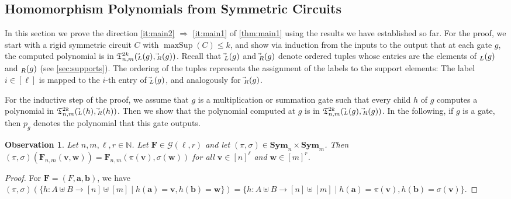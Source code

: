 \documentclass[10pt,a4paper]{article}
\theoremstyle{definition}
\theoremstyle{plain}
\newtheorem{observation}[definition]{Observation}
\theoremstyle{remark}
\newcommand{\Sym}{\mathbf{Sym}}
\let\sup\relax
\DeclareMathOperator{\sup}{sup}
\DeclareMathOperator{\maxSup}{maxSup}
\begin{document}
 	\subsection{Homomorphism Polynomials from Symmetric Circuits}
 
 	In this section we prove the direction \ref{it:main2} $\Rightarrow$ \ref{it:main1} of \cref{thm:main1} using the results we have established so far. For the proof, we start with a rigid symmetric circuit $C$ with $\maxSup(C) \leq k$, and show via induction from the inputs to the output that at each gate $g$, the computed polynomial is in $\mathfrak{T}^{2k}_{n,m}(\vec{\sup}_L(g), \vec{\sup}_R(g))$.  
 	Recall that $\vec{\sup}_L(g)$ and $\vec{\sup}_R(g)$ denote ordered tuples whose entries are the elements of $\sup_L(g)$ and $\sup_R(g)$ (see \cref{sec:supports}). The ordering of the tuples represents the assignment of the labels to the support elements:
 	The label $i \in[\ell]$ is mapped to the $i$-th entry of $\vec{\sup}_L(g)$, and analogously for $\vec{\sup}_R(g)$. 
 	
 	For the inductive step of the proof, we assume that $g$ is a multiplication or summation gate such that every child $h$ of $g$ computes a polynomial in $\mathfrak{T}_{n,m}^{2k}(\vec{\sup}_L(h), \vec{\sup}_R(h))$. Then we show that the polynomial computed at $g$ is in $\mathfrak{T}_{n,m}^{2k}(\vec{\sup}_L(g), \vec{\sup}_R(g))$. In the following, if $g$ is a gate, then $p_g$ denotes the polynomial that this gate outputs.
  	
  	\begin{observation}\label{lem:labelsMovedByPermutations}
   		Let $n,m, \ell, r \in \mathbb{N}$.
  		Let $\boldsymbol{F} \in \mathcal{G}(\ell, r)$ and let $(\pi,\sigma) \in \Sym_n \times \Sym_m$. 
  		Then $(\pi, \sigma)(\boldsymbol{F}_{n,m}(\boldsymbol{v}, \boldsymbol{w})) = \boldsymbol{F}_{n,m}(\pi(\boldsymbol{v}), \sigma(\boldsymbol{w}))$ for all $\boldsymbol{v} \in [n]^\ell$ and $\boldsymbol{w} \in [m]^r$.
  	\end{observation}	
  	\begin{proof}
 		For $\boldsymbol{F} = (F, \boldsymbol{a}, \boldsymbol{b})$,
  		we have $(\pi,\sigma)( \{ h\colon A \uplus B \to [n] \uplus [m] \mid h(\boldsymbol{a}) = \boldsymbol{v}, h(\boldsymbol{b}) = \boldsymbol{w} \} ) =  \{ h\colon A \uplus B \to [n] \uplus [m] \mid h(\boldsymbol{a}) = \pi(\boldsymbol{v}) , h(\boldsymbol{b}) = \sigma(\boldsymbol{v}) \}$.
  	\end{proof}	
  	
\end{document}
